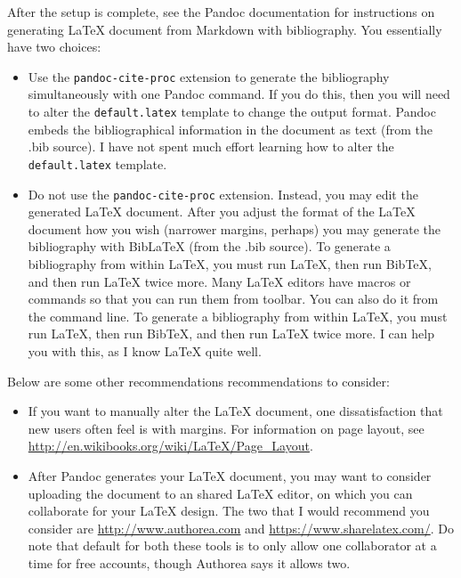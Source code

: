 \documentclass[]{article}
\begin{document}
After the setup is complete, see the Pandoc documentation for
instructions on generating LaTeX document from Markdown with
bibliography. You essentially have two choices:

\begin{itemize}
\itemsep1pt\parskip0pt
\item
  Use the \texttt{pandoc-cite-proc} extension to generate the
  bibliography simultaneously with one Pandoc command. If you do this,
  then you will need to alter the \texttt{default.latex} template to
  change the output format. Pandoc embeds the bibliographical
  information in the document as text (from the .bib source). I have not
  spent much effort learning how to alter the \texttt{default.latex}
  template.
\item
  Do not use the \texttt{pandoc-cite-proc} extension. Instead, you may
  edit the generated LaTeX document. After you adjust the format of the
  LaTeX document how you wish (narrower margins, perhaps) you may
  generate the bibliography with BibLaTeX (from the .bib source). To
  generate a bibliography from within LaTeX, you must run LaTeX, then
  run BibTeX, and then run LaTeX twice more. Many LaTeX editors have
  macros or commands so that you can run them from toolbar. You can also
  do it from the command line. To generate a bibliography from within
  LaTeX, you must run LaTeX, then run BibTeX, and then run LaTeX twice
  more. I can help you with this, as I know LaTeX quite well.
\end{itemize}

Below are some other recommendations recommendations to consider:

\begin{itemize}
\itemsep1pt\parskip0pt
\item
  If you want to manually alter the LaTeX document, one dissatisfaction
  that new users often feel is with margins. For information on page
  layout, see \url{http://en.wikibooks.org/wiki/LaTeX/Page_Layout}.
\item
  After Pandoc generates your LaTeX document, you may want to consider
  uploading the document to an shared LaTeX editor, on which you can
  collaborate for your LaTeX design. The two that I would recommend you
  consider are \url{http://www.authorea.com} and
  \url{https://www.sharelatex.com/}. Do note that default for both these
  tools is to only allow one collaborator at a time for free accounts,
  though Authorea says it allows two.
\end{itemize}
\end{document}
